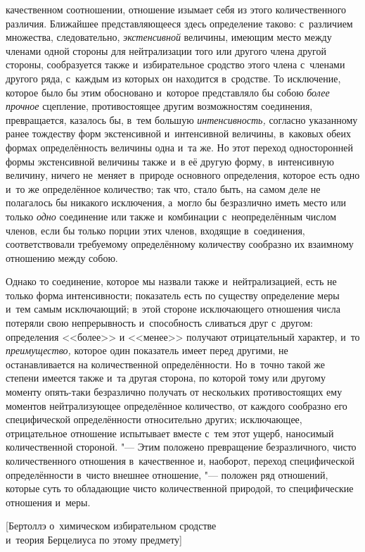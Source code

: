 качественном соотношении, отношение изымает себя из этого количественного
различия. Ближайшее представляющееся здесь определение таково: с~различием
множества, следовательно, {\em экстенсивной} величины, имеющим место между
членами одной стороны для нейтрализации того или другого члена другой стороны,
сообразуется также и~избирательное сродство этого члена с~членами другого ряда,
с~каждым из которых он находится в~сродстве. То исключение, которое было бы
этим обосновано и~которое представляло бы собою {\em более прочное} сцепление,
противостоящее другим возможностям соединения, превращается, казалось бы, в~тем
большую {\em интенсивность,} согласно указанному ранее тождеству форм
экстенсивной и~интенсивной величины, в~каковых обеих формах определённость
величины одна и~та же. Но этот переход односторонней формы экстенсивной
величины также и~в её другую форму, в~интенсивную величину, ничего не~меняет
в~природе основного определения, которое есть одно и~то же определённое
количество; так что, стало быть, на самом деле не полагалось бы никакого
исключения, а~могло бы безразлично иметь место или только {\em одно} соединение
или также и~комбинации с~неопределённым числом членов, если бы только порции
этих членов, входящие в~соединения, соответствовали требуемому определённому
количеству сообразно их взаимному отношению между собою.

Однако то соединение, которое мы назвали также и~нейтрализацией, есть не только
форма интенсивности; показатель есть по существу определение меры и~тем самым
исключающий; в~этой стороне исключающего отношения числа потеряли свою
непрерывность и~способность сливаться друг с~другом: определения <<более>> и
<<менее>> получают отрицательный характер, и~то {\em преимущество,} которое
один показатель имеет перед другими, не останавливается на количественной
определённости. Но в~точно такой же степени имеется также и~та другая сторона,
по которой тому или другому моменту опять-таки безразлично получать от
нескольких противостоящих ему моментов нейтрализующее определённое количество,
от каждого сообразно его специфической определённости относительно других;
исключающее, отрицательное отношение испытывает вместе с~тем этот ущерб,
наносимый количественной стороной. "--- Этим положено превращение
безразличного, чисто количественного отношения в~качественное и, наоборот,
переход специфической определённости в~чисто внешнее отношение, "--- положен
ряд отношений, которые суть то обладающие чисто количественной природой, то
специфические отношения и~меры.

%
{[Бертоллэ о~химическом избирательном сродстве\\
и~теория Берцелиуса по этому предмету]}

